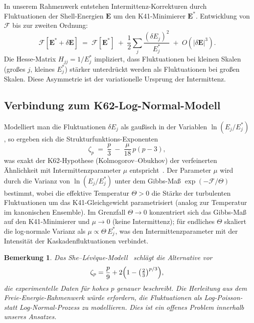 \documentclass[12pt,a4paper]{article}
\theoremstyle{breakdef}
\theoremstyle{breakplain}
\theoremstyle{breakdef}
\newtheorem{remark}[definition]{Bemerkung}
\begin{document}
In unserem Rahmenwerk entstehen Intermittenz-Korrekturen durch Fluktuationen
der Shell-Energien $\mathbf{E}$ um den K41-Minimierer $\mathbf{E}^*$.
Entwicklung von $\mathcal{F}$ bis zur zweiten Ordnung:
\begin{equation}\label{eq:F_expand}
  \mathcal{F}[\mathbf{E}^* + \delta\mathbf{E}]
  \;=\;
  \mathcal{F}[\mathbf{E}^*]
  \;+\;
  \frac{1}{2}\sum_{j}
    \frac{(\delta E_j)^2}{E_j^*}
  \;+\; O(|\delta\mathbf{E}|^3).
\end{equation}
Die Hesse-Matrix $H_{jj} = 1/E_j^*$ impliziert, dass Fluktuationen bei
kleinen Skalen (großes $j$, kleines $E_j^*$) stärker unterdrückt werden
als Fluktuationen bei großen Skalen. Diese Asymmetrie ist der variationelle
Ursprung der Intermittenz.

\subsection{Verbindung zum K62-Log-Normal-Modell}

Modelliert man die Fluktuationen $\delta E_j$ als gaußisch in der Variablen
$\ln(E_j/E_j^*)$, so ergeben sich die Strukturfunktions-Exponenten
\begin{equation}\label{eq:zeta_p}
  \zeta_p
  \;=\;
  \frac{p}{3}
  \;-\;
  \frac{\mu}{18}\,p(p-3),
\end{equation}
was exakt der K62-Hypothese (Kolmogorov--Obukhov) der verfeinerten
Ähnlichkeit mit Intermittenzparameter $\mu$ entspricht~\cite{K62,Frisch95}.
Der Parameter $\mu$ wird durch die Varianz von $\ln(E_j/E_j^*)$ unter dem
Gibbs-Maß $\exp(-\mathcal{F}/\Theta)$ bestimmt, wobei die effektive
Temperatur $\Theta > 0$ die Stärke der turbulenten Fluktuationen um das
K41-Gleichgewicht parametrisiert (analog zur Temperatur im kanonischen
Ensemble). Im Grenzfall $\Theta \to 0$ konzentriert sich das Gibbs-Maß
auf den K41-Minimierer und $\mu \to 0$ (keine Intermittenz); für
endliches $\Theta$ skaliert die log-normale Varianz als
$\mu \propto \Theta\,E_j^*$, was den Intermittenzparameter mit der
Intensität der Kaskadenfluktuationen verbindet.

\begin{remark}
Das She--Lévêque-Modell~\cite{SL94} schlägt die Alternative vor
\[
  \zeta_p = \frac{p}{9} + 2\Bigl(1 - \bigl(\tfrac{2}{3}\bigr)^{p/3}\Bigr),
\]
die experimentelle Daten für hohes $p$ genauer beschreibt. Die Herleitung
aus dem Freie-Energie-Rahmenwerk würde erfordern, die Fluktuationen als
Log-Poisson- statt Log-Normal-Prozess zu modellieren. Dies ist ein offenes
Problem innerhalb unseres Ansatzes.
\end{remark}
\end{document}

